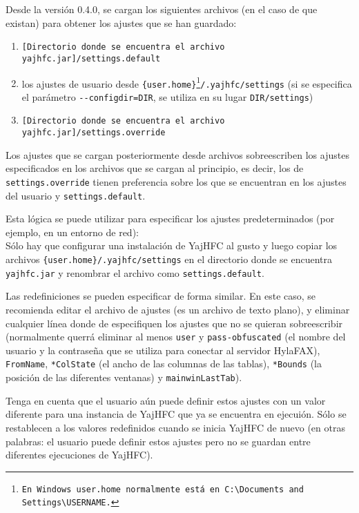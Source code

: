 \documentclass[a4paper,10pt]{scrartcl}
\begin{document}
Desde la versión 0.4.0, se cargan los siguientes archivos (en el caso de que existan) para obtener los ajustes que se han guardado:
\begin{enumerate}
 \item \texttt{[Directorio donde se encuentra el archivo yajhfc.jar]/settings.default}
 \item los ajustes de usuario desde \texttt{\{user.home\}\footnote{En Windows \texttt{user.home} normalmente está en \texttt{C:\textbackslash Documents and Settings\textbackslash USERNAME}.}/.yajhfc/settings} (si se especifica el parámetro \texttt{-{-}configdir=DIR}, se utiliza en su lugar \texttt{DIR/settings})
 \item \texttt{[Directorio donde se encuentra el archivo yajhfc.jar]/settings.override}
\end{enumerate}

Los ajustes que se cargan posteriormente desde archivos sobreescriben los ajustes especificados en los archivos que se cargan al principio, es decir, los de \texttt{settings.override} tienen preferencia sobre los que se encuentran en los ajustes del usuario y \texttt{settings.default}.
\medskip

Esta lógica se puede utilizar para especificar los ajustes predeterminados (por ejemplo, en un entorno de red): \\
Sólo hay que configurar una instalación de YajHFC al gusto y luego copiar los archivos \texttt{\{user.home\}/.yajhfc/settings} en el directorio donde se encuentra \texttt{yajhfc.jar} y renombrar el archivo como \texttt{settings.default}.
\medskip

Las redefiniciones se pueden especificar de forma similar. En este caso, se recomienda editar el archivo de ajustes (es un archivo de texto plano), y eliminar cualquier línea donde de especifiquen los ajustes que no se quieran sobreescribir (normalmente querrá eliminar al menos \texttt{user} y \texttt{pass-obfuscated} (el nombre del usuario y la contraseña que se utiliza para conectar al servidor HylaFAX), \texttt{FromName}, \texttt{*ColState} (el ancho de las columnas de las tablas), \texttt{*Bounds} (la posición de las diferentes ventanas) y \texttt{mainwinLastTab}).

Tenga en cuenta que el usuario aún puede definir estos ajustes con un valor diferente para una instancia de YajHFC que ya se encuentra en ejecuión. Sólo se restablecen a los valores redefinidos cuando se inicia YajHFC de nuevo (en otras palabras: el usuario puede definir estos ajustes pero no se guardan entre diferentes ejecuciones de YajHFC).
\end{document}
